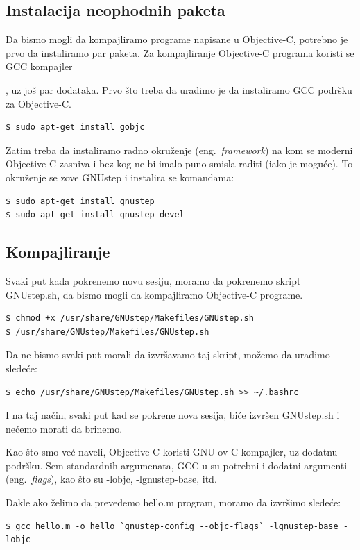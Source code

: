 \documentclass[a4paper]{article}
\begin{document}
\subsection{Instalacija neophodnih paketa}
Da bismo mogli da kompajliramo programe napisane u Objective-C, potrebno je prvo da instaliramo
par paketa. Za kompajliranje Objective-C programa koristi se GCC kompajler{\cite{gcc}, uz još par
dodataka.
Prvo što treba da uradimo je da instaliramo GCC podršku za Objective-C.

\begin{lstlisting}[frame=single]
$ sudo apt-get install gobjc
\end{lstlisting}

Zatim treba da instaliramo radno okruženje (eng.~{\em framework}) na kom se moderni Objective-C zasniva i bez kog
ne bi imalo puno smisla raditi (iako je moguće).
To okruženje se zove GNUstep \cite{gnustep} i instalira se komandama:

\begin{lstlisting}[frame=single]
$ sudo apt-get install gnustep
$ sudo apt-get install gnustep-devel
\end{lstlisting}

\subsection{Kompajliranje}
Svaki put kada pokrenemo novu sesiju, moramo da pokrenemo skript GNUstep.sh, da bismo mogli da kompajliramo Objective-C programe.
\begin{lstlisting}[frame=single]
$ chmod +x /usr/share/GNUstep/Makefiles/GNUstep.sh
$ /usr/share/GNUstep/Makefiles/GNUstep.sh
\end{lstlisting}

Da ne bismo svaki put morali da izvršavamo taj skript, možemo da uradimo sledeće:

\begin{lstlisting}[frame=single]
$ echo /usr/share/GNUstep/Makefiles/GNUstep.sh >> ~/.bashrc
\end{lstlisting}

I na taj način, svaki put kad se pokrene nova sesija, biće izvršen GNUstep.sh i nećemo morati da brinemo.

Kao što smo već naveli, Objective-C koristi GNU-ov C kompajler, uz dodatnu
podršku.
Sem standardnih argumenata, GCC-u su potrebni i dodatni argumenti (eng.~{\em flags}), kao što su -lobjc, -lgnustep-base, itd.

Dakle ako želimo da prevedemo hello.m program, moramo da izvršimo sledeće:
\begin{lstlisting}[frame=single]
$ gcc hello.m -o hello `gnustep-config --objc-flags` -lgnustep-base -lobjc
\end{lstlisting}

}
\end{document}
